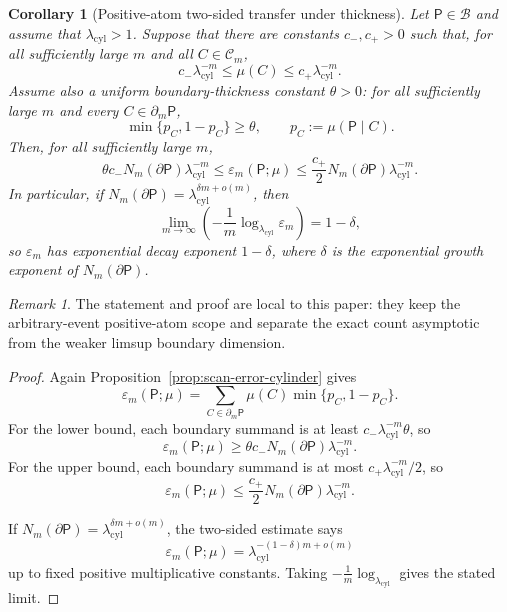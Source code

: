 \documentclass{etds}%
\numberwithin{equation}{section}
\theoremstyle{plain}
\newtheorem{corollary}[theorem]{Corollary}
\theoremstyle{definition}
\theoremstyle{remark}
\newtheorem{remark}[theorem]{Remark}
\begin{document}
\begin{corollary}[Positive-atom two-sided transfer under thickness]
\label{cor:volume-boundary-scaling}
Let $\mathsf{P}\in\mathcal{B}$ and assume that
$\lambda_{\mathrm{cyl}}>1$.  Suppose that there are constants
$c_-,c_+>0$ such that, for all sufficiently large $m$ and all
$C\in\mathcal{C}_m$,
\[
c_-\lambda_{\mathrm{cyl}}^{-m}
\le\mu(C)\le
c_+\lambda_{\mathrm{cyl}}^{-m}.
\]
Assume also a uniform boundary-thickness constant $\theta>0$: for all
sufficiently large $m$ and every $C\in\partial_m\mathsf{P}$,
\[
\min\{p_C,1-p_C\}\ge\theta,
\qquad p_C:=\mu(\mathsf{P}\mid C).
\]
Then, for all sufficiently large $m$,
\[
\theta c_-N_m(\partial\mathsf{P})\lambda_{\mathrm{cyl}}^{-m}
\le \varepsilon_m(\mathsf{P};\mu)
\le \frac{c_+}{2}N_m(\partial\mathsf{P})\lambda_{\mathrm{cyl}}^{-m}.
\]
In particular, if
$N_m(\partial\mathsf{P})=\lambda_{\mathrm{cyl}}^{\delta m+o(m)}$, then
\[
\lim_{m\to\infty}\left(-\frac{1}{m}\log_{\lambda_{\mathrm{cyl}}}\varepsilon_m\right)=1-\delta,
\]
so $\varepsilon_m$ has exponential decay exponent $1-\delta$, where $\delta$
is the exponential growth exponent of $N_m(\partial\mathsf{P})$.
\end{corollary}

\begin{remark}
The statement and proof are local to this paper: they keep the arbitrary-event
positive-atom scope and separate the exact count asymptotic from the weaker
limsup boundary dimension.
\end{remark}

\begin{proof}
Again Proposition~\ref{prop:scan-error-cylinder} gives
\[
\varepsilon_m(\mathsf{P};\mu)
=\sum_{C\in\partial_m\mathsf{P}}\mu(C)\min\{p_C,1-p_C\}.
\]
For the lower bound, each boundary summand is at least
$c_-\lambda_{\mathrm{cyl}}^{-m}\theta$, so
\[
\varepsilon_m(\mathsf{P};\mu)
\ge
\theta c_-N_m(\partial\mathsf{P})\lambda_{\mathrm{cyl}}^{-m}.
\]
For the upper bound, each boundary summand is at most
$c_+\lambda_{\mathrm{cyl}}^{-m}/2$, so
\[
\varepsilon_m(\mathsf{P};\mu)
\le
\frac{c_+}{2}N_m(\partial\mathsf{P})\lambda_{\mathrm{cyl}}^{-m}.
\]

If $N_m(\partial\mathsf{P})=\lambda_{\mathrm{cyl}}^{\delta m+o(m)}$, the
two-sided estimate says
\[
\varepsilon_m(\mathsf{P};\mu)
=\lambda_{\mathrm{cyl}}^{-(1-\delta)m+o(m)}
\]
up to fixed positive multiplicative constants.  Taking
$-\frac1m\log_{\lambda_{\mathrm{cyl}}}$ gives the stated limit.
\end{proof}
\end{document}
